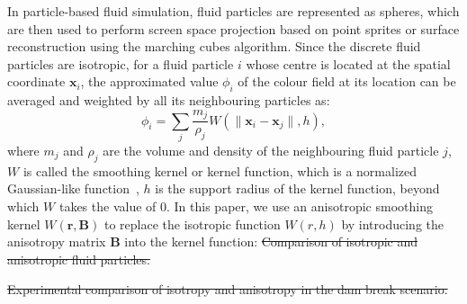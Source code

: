 \documentclass[times,twocolumn,final]{elsarticle}
\providecommand{\DIFdeltex}[1]{{\protect\color{red}\sout{#1}}}                      %
\providecommand{\DIFdelbegin}{} %
\providecommand{\DIFdelend}{} %
\providecommand{\DIFdelFL}[1]{\DIFdel{#1}} %
\providecommand{\DIFdel}[1]{\texorpdfstring{\DIFdeltex{#1}}{}} %
\begin{document}
In particle-based fluid simulation, fluid particles are represented as spheres, which are then used to perform screen space projection based on point sprites or surface reconstruction using the marching cubes algorithm. Since the discrete fluid particles are isotropic, for a fluid particle $i$ whose centre is located at the spatial coordinate $\mathbf{x}_i$, the approximated value $\phi_i$ of the colour field at its location can be averaged and weighted by all its neighbouring particles as:
\begin{equation}
\phi_{i}=\sum_{j} \frac{m_{j}}{\rho_{j}} W\left(\|\mathbf{x}_i-\mathbf{x}_j\|, h\right),
\label{con:equa9}
\end{equation}
where $m_j$ and $\rho_j$ are the volume and density of the neighbouring fluid particle $j$, $W$ is called the smoothing kernel or kernel function, which is a normalized Gaussian-like function~\cite{Ihmsen14}, $h$ is the support radius of the kernel function, beyond which $W$ takes the value of 0. In this paper, we use an anisotropic smoothing kernel $W(\mathbf{r},\mathbf{B})$ to replace the isotropic function $W(r,h)$ by introducing the anisotropy matrix $\mathbf{B}$ into the kernel function:
\DIFdelbegin %
{%
\DIFdelFL{Comparison of isotropic and anisotropic fluid particles.}}

{%
\DIFdelFL{Experimental comparison of isotropy and anisotropy in the dam break scenario.}}
\DIFdelend 
\end{document}
